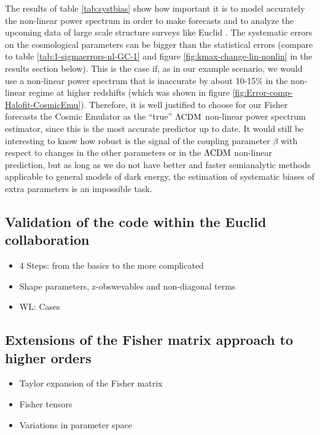 The results of table \ref{tab:systbias} show how important it is
to model accurately the non-linear power spectrum in order to make
forecasts and to analyze the upcoming data of large scale structure
surveys like Euclid \cite{amendola_cosmology_2012-short}. The systematic
errors on the cosmological parameters can be bigger than the statistical
errors (compare to table \ref{tab:1-sigmaerrors-nl-GC-1} and figure
\ref{fig:kmax-change-lin-nonlin} in the results section below). This
is the case if, as in our example scenario, we would use a non-linear
power spectrum that is inaccurate by about 10-15\% in the non-linear
regime at higher redshifts (which was shown in figure \ref{fig:Error-comp-Halofit-CosmicEmu}).
Therefore, it is well justified to choose for our Fisher forecasts
the Cosmic Emulator as the ``true'' $\Lambda\mathrm{CDM}$ non-linear power spectrum
estimator, since this is the most accurate predictor up to date. It
would still be interesting to know how robust is the signal of the
coupling parameter $\beta$ with respect to changes in the other parameters
or in the $\Lambda\mathrm{CDM}$ non-linear prediction, but as long as we do not
have better and faster semianalytic methods applicable to general
models of dark energy, the estimation of systematic biases of extra
parameters is an impossible task.



\subsection{Validation of the code within the Euclid collaboration}
\begin{itemize}
\item 4 Steps: from the basics to the more complicated
\item Shape parameters, z-obswevables and non-diagonal terms
\item WL: Cases
\end{itemize}

\subsection{Extensions of the Fisher matrix approach to higher orders}
\begin{itemize}
\item Taylor expansion of the Fisher matrix
\item Fisher tensors
\item Variations in parameter space
\end{itemize}






